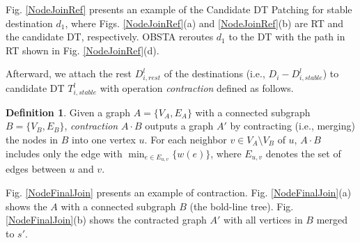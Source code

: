 \documentclass[10pt, conference, letterpaper]{IEEEtran}
\theoremstyle{definition}
\newtheorem{defi}{Definition}
\begin{document}
\begin{Example}
Fig. \ref{NodeJoinRef} presents an example of the Candidate DT Patching for stable destination $d_1$, where Figs. \ref{NodeJoinRef}(a) and \ref{NodeJoinRef}(b) are RT and the candidate DT, respectively. OBSTA reroutes $d_1$ to the DT with the path in RT shown in Fig. \ref{NodeJoinRef}(d).
\end{Example}


Afterward, we attach the rest $D_{i,rest}^{l}$ of the destinations (i.e., $D_i-D_{i,stable}^{l}$) to candidate DT $T_{i,stable}^{l}$ with operation \emph{contraction} defined as follows.
\begin{defi}
Given a graph $A=\{V_A,E_A\}$ with a connected subgraph $B=\{V_B,E_B\}$, \emph{contraction} $A\cdot B$ outputs a graph $A'$ by contracting (i.e., merging) the nodes in $B$ into one vertex $u$. For each neighbor $v\in V_A\setminus V_B$ of $u$, $A\cdot B$ includes only the edge with $\min_{e\in E_{u,v}}\{w(e)\}$, where $E_{u,v}$ denotes the set of edges between $u$ and $v$.
\end{defi}
\begin{Example}
Fig. \ref{NodeFinalJoin} presents an example of contraction.
Fig. \ref{NodeFinalJoin}(a) shows the $A$ with a connected subgraph $B$ (the bold-line tree). Fig. \ref{NodeFinalJoin}(b) shows the contracted graph $A'$ with all vertices in $B$ merged to $s'$.
\end{Example}
\end{document}
